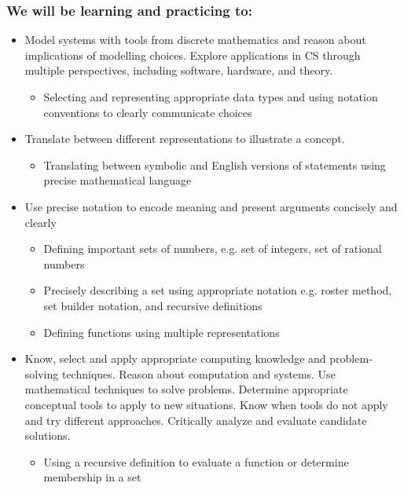 \subsubsection*{We will be learning and practicing to:}
\begin{itemize}
\item Model systems with tools from discrete mathematics and reason about implications of modelling choices. Explore applications in CS through multiple perspectives, including software, hardware, and theory.
\begin{itemize}

   \item Selecting and representing appropriate data types and using notation conventions to clearly communicate choices

\end{itemize}

\item Translate between different representations to illustrate a concept.

\begin{itemize}
   \item Translating between symbolic and English versions of statements using precise mathematical language
\end{itemize}


\item Use precise notation to encode meaning and present arguments concisely and clearly
\begin{itemize}
    \item Defining important sets of numbers, e.g. set of integers, set of rational numbers
    \item Precisely describing a set using appropriate notation e.g. roster method, set builder notation, and recursive definitions
    \item Defining functions using multiple representations
\end{itemize}

\item Know, select and apply appropriate computing knowledge and problem-solving techniques. Reason about computation and systems. Use mathematical techniques to solve problems. Determine appropriate conceptual tools to apply to new situations. Know when tools do not apply and try different approaches. Critically analyze and evaluate candidate solutions.
\begin{itemize}
    \item Using a recursive definition to evaluate a function or determine membership in a set
\end{itemize}

\end{itemize}

